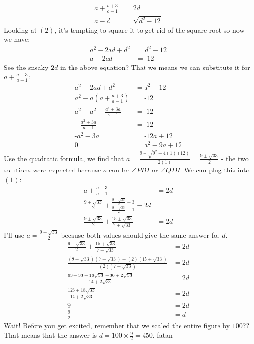 \begin{enumerate}
 \begin{align}a+\frac{a+3}{a-1}&=2d \\ a - d &= \sqrt{d^{2}-12} \end{align} Looking at $\left(2\right)$, it's tempting to square it to get rid of the square-root so now we have: 
 \begin{align*}a^{2}-2ad+d^{2}&=d^{2}-12 \\ a - 2ad &= \text{-}12 \end{align*}
 See the sneaky $2d$ in the above equation? That we means we can substitute it for $a+\frac{a+3}{a-1}$: 
 \begin{align*}a^{2}-2ad+d^{2}&=d^{2}-12 \\ a^{2} - a\left(a+\frac{a+3}{a-1}\right) &= \text{-}12 \\ a^{2}-a^{2}-\frac{a^{2}+3a}{a-1} &=\text{-}12 \\ -\frac{a^{2}+3a}{a-1}&=\text{-}12 \\ \text{-}a^{2}-3a&=\text{-}12a+12 \\ 0 &= a^{2}-9a+12 \end{align*}
 Use the quadratic formula, we find that $a=\frac{9\pm\sqrt{9^{2}-4\left(1\right)\left(12\right)}}{2\left(1\right)}=\frac{9\pm\sqrt{33}}{2}$ - the two solutions were expected because $a$ can be $\angle PDI$ or $\angle QDI$. We can plug this into $\left(1\right)$: 
 \begin{align*}a+\frac{a+3}{a-1}&=2d \\ \frac{9\pm\sqrt{33}}{2}+\frac{\frac{9\pm\sqrt{33}}{2}+3}{\frac{9\pm\sqrt{33}}{2}-1}=2d \\ \frac{9\pm\sqrt{33}}{2}+\frac{15\pm\sqrt{33}}{7\pm\sqrt{33}} &= 2d\end{align*}
 I'll use $a=\frac{9+\sqrt{33}}{2}$ because both values should give the same answer for $d$. 
 \begin{align*} \frac{9+\sqrt{33}}{2}+\frac{15+\sqrt{33}}{7+\sqrt{33}} &= 2d \\ \frac{\left(9+\sqrt{33}\right)\left(7+\sqrt{33}\right)+\left(2\right)\left(15+\sqrt{33}\right)}{\left(2\right)\left(7+\sqrt{33}\right)} &= 2d \\ \frac{63+33+16\sqrt{33}+30+2\sqrt{33}}{14+2\sqrt{33}} &= 2d \\ \frac{126+18\sqrt{33}}{14+2\sqrt{33}} &= 2d \\ 9 &= 2d \\ \frac{9}{2} &= d\end{align*}
 Wait! Before you get excited, remember that we scaled the entire figure by $100$?? That means that the answer is $d=100\times\frac{9}{2}=\boxed{450}$.-fatan


\end{enumerate}
